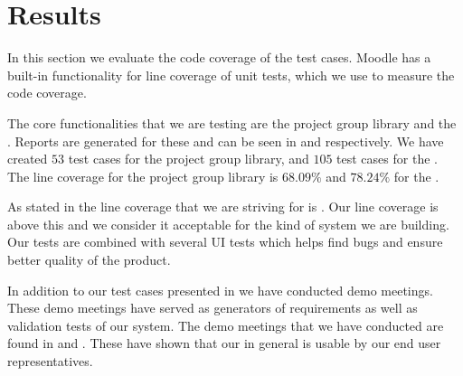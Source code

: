 \section{Results}
\label{sec:results}
In this section we evaluate the code coverage of the test cases. 
Moodle has a built-in functionality for line coverage of unit tests, which we use to measure the code coverage.

The core functionalities that we are testing are the project group library and the \admlib{}.
Reports are generated for these and can be seen in  and  respectively.
We have created $53$ test cases for the project group library, and $105$ test cases for the \admlib{}.
The line coverage for the project group library is $68.09\%$ and $78.24\%$ for the \admlib{}.

As stated in  the line coverage that we are striving for is \idealCC{}.
Our line coverage is above this and we consider it acceptable for the kind of system we are building. 
Our tests are combined with several UI tests which helps find bugs and ensure better quality of the product.

In addition to our test cases presented in  we have conducted demo meetings.
These demo meetings have served as generators of requirements as well as validation tests of our system.
The demo meetings that we have conducted are found in  and .
These have shown that our \subsystem{} in general is usable by our end user representatives.